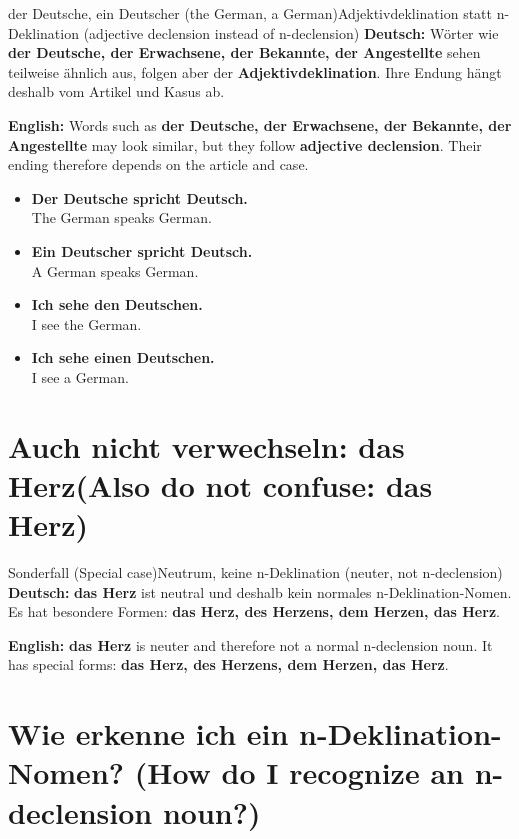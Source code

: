 \documentclass[a4paper,11pt]{article}
\newcommand{\GermanText}[1]{\textbf{Deutsch: }#1\par}
\newcommand{\EnglishText}[1]{{\small\color{SoftGray}\textbf{English: }#1\par}}
\newcommand{\ExampleItem}[2]{\item \textbf{#1}\\{\small\color{SoftGray}#2}}
\begin{document}
        \begin{grammarentry}{der Deutsche, ein Deutscher \textnormal{(the German, a German)}}{Adjektivdeklination statt n-Deklination \textnormal{(adjective declension instead of n-declension)}}
            \GermanText{Wörter wie \textbf{der Deutsche, der Erwachsene, der Bekannte, der Angestellte} sehen teilweise ähnlich aus, folgen aber der \textbf{Adjektivdeklination}. Ihre Endung hängt deshalb vom Artikel und Kasus ab.}
            \EnglishText{Words such as \textbf{der Deutsche, der Erwachsene, der Bekannte, der Angestellte} may look similar, but they follow \textbf{adjective declension}. Their ending therefore depends on the article and case.}
        \end{grammarentry}

        \begin{exbox}
            \begin{itemize}
                \ExampleItem{Der Deutsche spricht Deutsch.}{The German speaks German.}
                \ExampleItem{Ein Deutscher spricht Deutsch.}{A German speaks German.}
                \ExampleItem{Ich sehe den Deutschen.}{I see the German.}
                \ExampleItem{Ich sehe einen Deutschen.}{I see a German.}
            \end{itemize}
        \end{exbox}

    \section{Auch nicht verwechseln: \glqq das Herz\grqq \textnormal{(Also do not confuse: \glqq das Herz\grqq)}}

        \begin{grammarentry}{Sonderfall \textnormal{(Special case)}}{Neutrum, keine n-Deklination \textnormal{(neuter, not n-declension)}}
            \GermanText{\textbf{das Herz} ist neutral und deshalb kein normales n-Deklination-Nomen. Es hat besondere Formen: \textbf{das Herz, des Herzens, dem Herzen, das Herz}.}
            \EnglishText{\textbf{das Herz} is neuter and therefore not a normal n-declension noun. It has special forms: \textbf{das Herz, des Herzens, dem Herzen, das Herz}.}
        \end{grammarentry}

    \section{Wie erkenne ich ein n-Deklination-Nomen? \textnormal{(How do I recognize an n-declension noun?)}}
\end{document}
